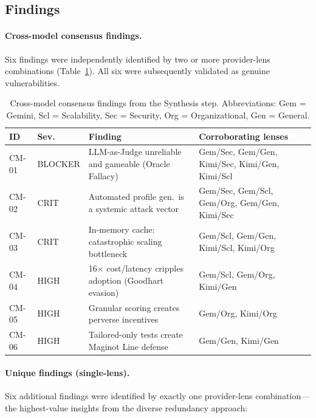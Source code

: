 \documentclass[11pt,a4paper]{article}
\begin{document}
\subsection{Findings}

\paragraph{Cross-model consensus findings.}
Six findings were independently identified by two or more provider-lens combinations (Table~\ref{tab:pilot-consensus}).
All six were subsequently validated as genuine vulnerabilities.

\begin{table}[h]
\centering
\small
\begin{tabular}{@{}llp{5.5cm}l@{}}
\toprule
ID & Sev. & Finding & Corroborating lenses \\ \midrule
CM-01 & BLOCKER & LLM-as-Judge unreliable and gameable (Oracle Fallacy) & Gem/Sec, Gem/Gen, Kimi/Sec, Kimi/Gen, Kimi/Scl \\
CM-02 & CRIT & Automated profile gen.\ is a systemic attack vector & Gem/Sec, Gem/Scl, Gem/Org, Gem/Gen, Kimi/Sec \\
CM-03 & CRIT & In-memory cache: catastrophic scaling bottleneck & Gem/Scl, Gem/Gen, Kimi/Scl, Kimi/Org \\
CM-04 & HIGH & 16$\times$ cost/latency cripples adoption (Goodhart evasion) & Gem/Scl, Gem/Org, Kimi/Gen \\
CM-05 & HIGH & Granular scoring creates perverse incentives & Gem/Org, Kimi/Org \\
CM-06 & HIGH & Tailored-only tests create Maginot Line defense & Gem/Gen, Kimi/Gen \\
\bottomrule
\end{tabular}
\caption{Cross-model consensus findings from the Synthesis step. Abbreviations: Gem = Gemini, Scl = Scalability, Sec = Security, Org = Organizational, Gen = General.}
\label{tab:pilot-consensus}
\end{table}

\paragraph{Unique findings (single-lens).}
Six additional findings were identified by exactly one provider-lens combination---the highest-value insights from the diverse redundancy approach:
\end{document}
